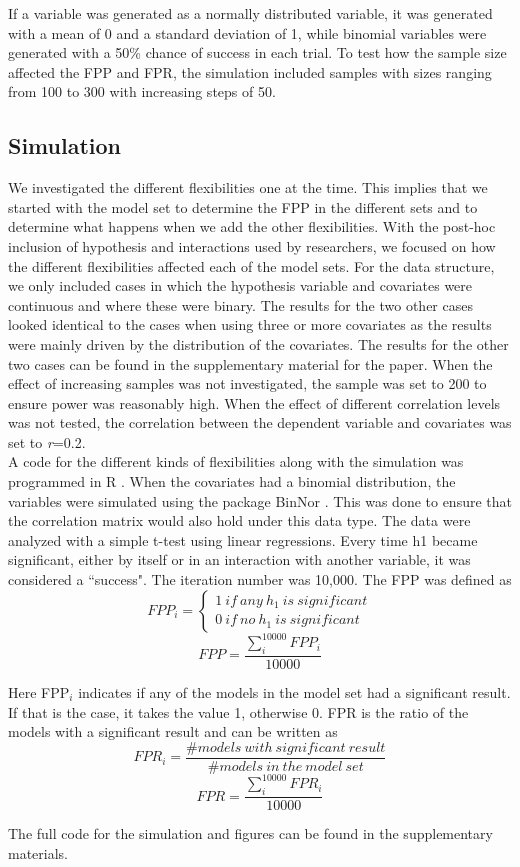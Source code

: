 If a variable was generated as a normally distributed variable, it was generated with a mean of 0 and a standard deviation of 1, while binomial variables were generated with a 50\% chance of success in each trial. To test how the sample size affected the FPP and FPR, the simulation included samples with sizes ranging from 100 to 300 with increasing steps of 50. 

\subsection{Simulation}
We investigated the different flexibilities one at the time. This implies that we started with the model set to determine the FPP in the different sets and to determine what happens when we add the other flexibilities. With the post-hoc inclusion of hypothesis and interactions used by researchers, we focused on how the different flexibilities affected each of the model sets. For the data structure, we only included cases in which the hypothesis variable and covariates were continuous and where these were binary. The results for the two other cases looked identical to the cases when using three or more covariates as the results were mainly driven by the distribution of the covariates. The results for the other two cases can be found in the supplementary material for the paper. When the effect of increasing samples was not investigated, the sample was set to 200 to ensure power was reasonably high. When the effect of different correlation levels was not tested, the correlation between the dependent variable and covariates was set to \textit{r}=0.2.\\

A code for the different kinds of flexibilities along with the simulation was programmed in R \citep{Team2018}. When the covariates had a binomial distribution, the variables were simulated using the package BinNor \citep{Demirtas2014}. This was done to ensure that the correlation matrix would also hold under this data type. The data were analyzed with a simple t-test using linear regressions. Every time h1 became significant, either by itself or in an interaction with another variable, it was considered a “success". The iteration number was 10,000. The FPP was defined as \\

\[FPP_i=\left. \left\{\begin{array}{c}
1\ if\ any\ h_1\ is\ significant \\ 
0\ if\ no\ h_1\ is\ significant\  \end{array}
\right.\] 
\[FPP=\frac{\sum^{10000}_i{FPP_i}}{10000}\] 


Here FPP${}_{i}$ indicates if any of the models in the model set had a significant result. If that is the case, it takes the value 1, otherwise 0. FPR is the ratio of the models with a significant result and can be written as \\

\[FPR_i=\frac{\#models\ with\ significant\ result}{\#models\ in\ the\ model\ set}\] 
\[FPR=\frac{\sum^{10000}_i{FPR_i}}{10000}\] 


The full code for the simulation and figures can be found in the supplementary materials. 

